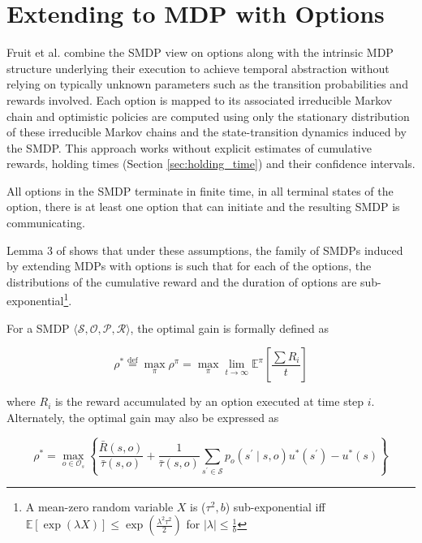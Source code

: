 \section{Extending to MDP with Options}

Fruit et al. \cite{fruit_exploration--exploitation_2017, fruit_regret_2017} combine the SMDP view on options along with the intrinsic MDP structure underlying their execution to achieve temporal abstraction without relying on typically unknown parameters such as the transition probabilities and rewards involved.
Each option is mapped to its associated irreducible Markov chain and optimistic policies are computed using only the stationary distribution of these irreducible Markov chains and the state-transition dynamics induced by the SMDP. 
This approach works without explicit estimates of cumulative rewards, holding times (Section \ref{sec:holding_time}) and their confidence intervals.

\begin{assumption}
\label{asm:option}
All options in the SMDP terminate in finite time, in all terminal states of the option, there is at least one option that can initiate and the resulting SMDP is communicating.
\end{assumption}
Lemma 3 of \cite{fruit_exploration--exploitation_2017} shows that under these assumptions, the family of SMDPs induced by extending MDPs with options is such that for each of the options, the distributions of the cumulative reward and the duration of options are sub-exponential\footnote{A mean-zero random variable $X$ is ($\tau^2, b$) sub-exponential iff $\mathbb{E}[\exp(\lambda X)] \le \exp\left( \frac{\lambda^2 \tau^2}{2} \right)$ for $|\lambda| \le \frac{1}{b}$}.

For a SMDP $\langle \mathcal{S}, \mathcal{O}, \mathcal{P}, \mathcal{R} \rangle$, the optimal gain is formally defined as 

\begin{equation}
    \rho^* \overset{\mathrm{def}}{=} \max_\pi \rho^\pi = \max_\pi \lim_{t \to \infty} \mathbb{E}^\pi \left[ \frac{\sum{R_i}}{t} \right]
\end{equation}

where $R_i$ is the reward accumulated by an option executed at time step $i$. Alternately, the optimal gain may also be expressed as

\begin{equation}
    \label{eq:optimal_bias}
    \rho^* = \max_{o \in \mathcal{O}_s} \left\{ \frac{\bar{R}(s, o)}{\bar{\tau}(s, o)} + \frac{1}{\bar{\tau}(s, o)} \sum_{s^\prime \in \mathcal{S}} p_o(s^\prime \mid s, o) u^*(s^\prime) - u^*(s) \right\}
\end{equation}

